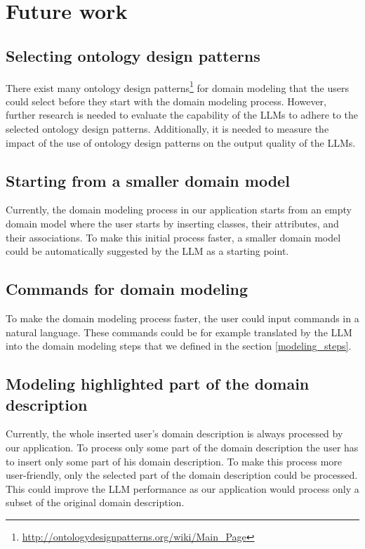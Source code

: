 \chapter{Future work}


\section{Selecting ontology design patterns}

There exist many ontology design patterns\footnote{\url{http://ontologydesignpatterns.org/wiki/Main_Page}} for domain modeling that the users could select before they start with the domain modeling process. However, further research is needed to evaluate the capability of the LLMs to adhere to the selected ontology design patterns. Additionally, it is needed to measure the impact of the use of ontology design patterns on the output quality of the LLMs. 


\section{Starting from a smaller domain model}

Currently, the domain modeling process in our application starts from an empty domain model where the user starts by inserting classes, their attributes, and their associations. To make this initial process faster, a smaller domain model could be automatically suggested by the LLM as a starting point.


\section{Commands for domain modeling}

To make the domain modeling process faster, the user could input commands in a natural language. These commands could be for example translated by the LLM into the domain modeling steps that we defined in the section \ref{modeling_steps}.


\section{Modeling highlighted part of the domain description}

Currently, the whole inserted user's domain description is always processed by our application. To process only some part of the domain description the user has to insert only some part of his domain description. To make this process more user-friendly, only the selected part of the domain description could be processed. This could improve the LLM performance as our application would process only a subset of the original domain description.


